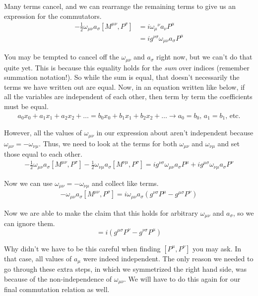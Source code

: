 \documentclass[12pt]{article}
\begin{document}
Many terms cancel, and we can rearrange the remaining terms to give us an expression for the commutators.
\begin{align*}
    -\frac{1}{2}\omega_{\mu\nu}a_\sigma[M^{\mu\nu},P^\sigma]&=i{\omega_\mu}^\nu a_\nu P^\mu \\
    &= i g^{\nu\sigma} \omega_{\mu\nu} a_\sigma P^\mu
\end{align*}

You may be tempted to cancel off the $\omega_{\mu\nu}$ and $a_\sigma$ right now, but we can't do that quite yet. This is because this equality holds for the \textit{sum} over indices (remember summation notation!). So while the sum is equal, that doesn't necessarily the terms we have written out are equal. Now, in an equation written like below, if all the variables are independent of each other, then term by term the coefficients must be equal.
\begin{align*}
    a_0 x_0 + a_1 x_1 + a_2 x_2 + \dots = b_0 x_0 + b_1 x_1 + b_2 x_2 + \dots \rightarrow a_0 = b_0\text{, }a_1 = b_1\text{, etc.}
\end{align*}

However, all the values of $\omega_{\mu\nu}$ in our expression about aren't independent because $\omega_{\mu\nu}=-\omega_{\nu\mu}$. Thus, we need to look at the terms for both $\omega_{\mu\nu}$ and $\omega_{\nu\mu}$ and set those equal to each other.
\begin{align*}
    -\frac{1}{2}\omega_{\mu\nu}a_\sigma[M^{\mu\nu},P^\sigma]-\frac{1}{2}\omega_{\nu\mu}a_\sigma[M^{\nu\mu},P^\sigma]=i g^{\nu\sigma} \omega_{\mu\nu} a_\sigma P^\mu+i g^{\mu\sigma} \omega_{\nu\mu} a_\sigma P^\nu
\end{align*}

Now we can use $\omega_{\mu\nu}=-\omega_{\nu\mu}$ and collect like terms.
\begin{align*}
    -\omega_{\mu\nu}a_\sigma[M^{\mu\nu},P^\sigma]=i \omega_{\mu\nu} a_\sigma(g^{\nu\sigma} P^\mu- g^{\mu\sigma} P^\nu)
\end{align*}

Now we are able to make the claim that this holds for arbitrary $\omega_{\mu\nu}$ and $a_\sigma$, so we can ignore them.
\begin{equation}
    [M^{\mu\nu},P^\sigma]=i(g^{\mu\sigma} P^\nu-g^{\nu\sigma} P^\mu)
\end{equation}

Why didn't we have to be this careful when finding $[P^\mu,P^\nu]$ you may ask. In that case, all values of $a_\mu$ were indeed independent. The only reason we needed to go through these extra steps, in which we symmetrized the right hand side, was because of the non-independence of $\omega_{\mu\nu}$. We will have to do this again for our final commutation relation as well.
\end{document}
